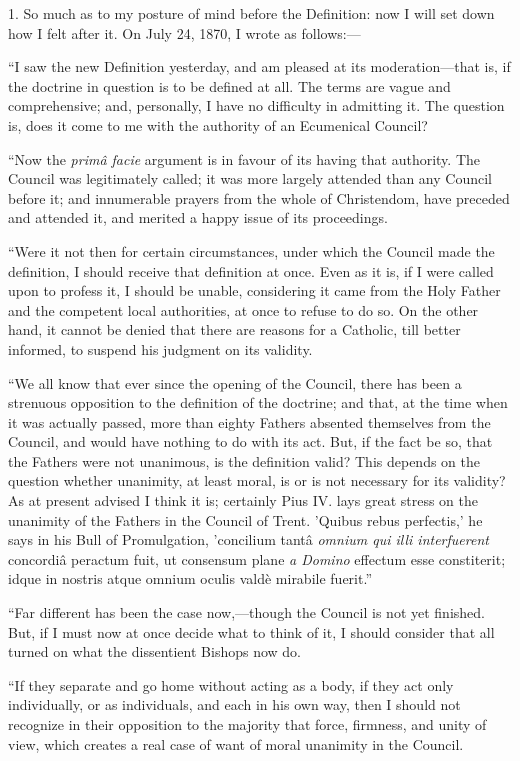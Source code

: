1. So much as to my posture of mind before the Definition: now I will
set down how I felt after it. On July 24, 1870, I wrote as follows:—

``I saw the new Definition yesterday, and am pleased at its
moderation—that is, if the doctrine in question is to be defined at
all. The terms are vague and comprehensive; and, personally, I have no
difficulty in admitting it. The question is, does it come to me with the
authority of an Ecumenical Council?

``Now the \emph{primâ facie} argument is in favour of its having
that authority. The Council was legitimately called; it was more largely
attended than any Council before it; and innumerable prayers from the
whole of Christendom, have preceded and attended it, and merited a happy
issue of its proceedings.

``Were it not then for certain circumstances, under which the
Council made the definition, I should receive that definition at once.
Even as it is, if I were called upon to profess it, I should be unable,
considering it came from the Holy Father and the competent local authorities, at once to refuse to do so. On the other hand, it cannot be
denied that there are reasons for a Catholic, till better informed, to
suspend his judgment on its validity.

``We all know that ever since the opening of the Council, there
has been a strenuous opposition to the definition of the doctrine; and
that, at the time when it was actually passed, more than eighty Fathers
absented themselves from the Council, and would have nothing to do with
its act. But, if the fact be so, that the Fathers were not unanimous, is
the definition valid? This depends on the question whether unanimity, at
least moral, is or is not necessary for its validity? As at present
advised I think it is; certainly Pius IV. lays great stress on the
unanimity of the Fathers in the Council of Trent. 'Quibus rebus
perfectis,' he says in his Bull of Promulgation, 'concilium tantâ \emph{omnium
qui illi interfuerent} concordiâ peractum fuit, ut consensum plane \emph{a
Domino} effectum esse constiterit; idque in nostris atque omnium
oculis valdè mirabile fuerit.''

``Far different has been the case now,—though the Council is
not yet finished. But, if I must now at once decide what to think of it,
I should consider that all turned on what the dissentient Bishops now
do.

``If they separate and go home without acting as a body, if they
act only individually, or as individuals, and each in his own way, then
I should not recognize in their opposition to the majority that force,
firmness, and unity of view, which creates a real case of want of moral
unanimity in the Council.

